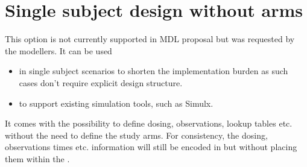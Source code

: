 \section{Single subject design without arms} 
\label{sec:noArms}
This option is not currently supported in MDL proposal but was requested by 
the modellers. It can be used 
\begin{itemize}
\item 
in single subject scenarios to shorten the implementation burden 
as such cases don't require explicit design structure. 
\item 
to support existing simulation tools, such as Simulx.
\end{itemize}
It comes with the possibility to define dosing, observations, lookup tables 
etc. without the need to define the study arms. For consistency, the dosing,
observations times etc. information will still be encoded in  but 
without placing them within the . 
